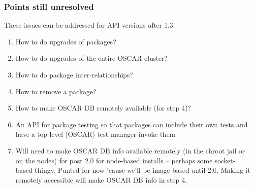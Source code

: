 
\subsubsection{Points still unresolved}

These issues can be addressed for API versions after 1.3.

\begin{enumerate}
\item How to do upgrades of packages?
\item How to do upgrades of the entire OSCAR cluster?
\item How to do package inter-relationships?
\item How to remove a package?
\item How to make OSCAR DB remotely available (for step 4)?
\item An API for package testing so that packages can include their
  own tests and have a top-level (OSCAR) test manager invoke them
  
\item Will need to make OSCAR DB info available remotely (in the
  chroot jail or on the nodes) for post 2.0 for node-based installs --
  perhaps some socket-based thingy.  Punted for now 'cause we'll be
  image-based until 2.0.  Making it remotely accessible will make
  OSCAR DB info in step 4.
\end{enumerate}


